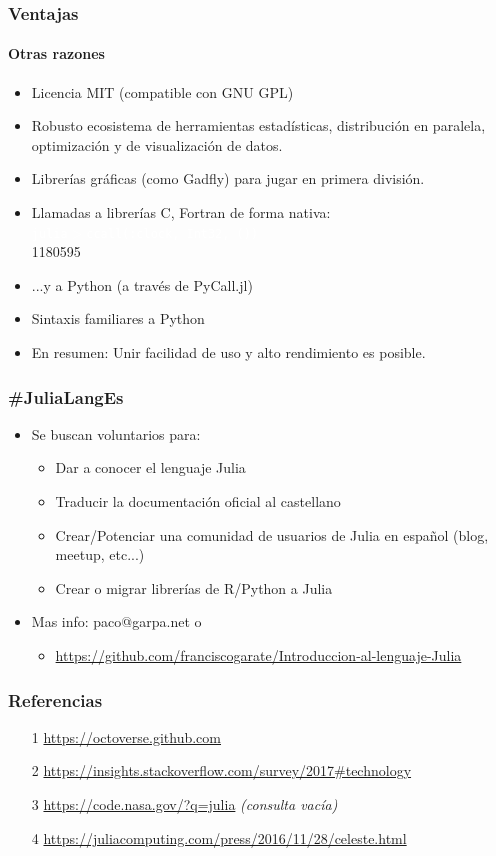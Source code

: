 \documentclass{beamer}
\providecommand{\comando}[1]{\texttt{\colorbox{morado_w}{\textcolor{white}{#1}}}}
\begin{document}
\begin{frame}
\frametitle{Ventajas}
\framesubtitle{Otras razones}
\begin{itemize}
	\item Licencia MIT (compatible con GNU GPL)
	\item Robusto ecosistema de herramientas estadísticas, distribución en paralela, optimización y de visualización de datos.
	\item Librerías gráficas (como Gadfly) para jugar en primera división.
	\item Llamadas a librerías C, Fortran de forma nativa:\\
	\comando{julia$>$ccall(:clock, Int32, ())}\\
	1180595\\
	\item ...y a Python (a través de PyCall.jl)
	\item Sintaxis familiares a Python
	\item En resumen: Unir facilidad de uso y alto rendimiento es posible.
\end{itemize}
\end{frame}


\begin{frame}
\frametitle{\#JuliaLangEs}
\begin{itemize}
	\item Se buscan voluntarios para:
	\begin{itemize}
		\item Dar a conocer el lenguaje Julia 
		\item Traducir la documentación oficial al castellano
		\item Crear/Potenciar una comunidad de usuarios de Julia en español (blog, meetup, etc...)
		\item Crear o migrar librerías de R/Python a Julia
	\end{itemize}
	\item Mas info: paco@garpa.net o
	\begin{itemize}
	\item \url{https://github.com/franciscogarate/Introduccion-al-lenguaje-Julia}
	\end{itemize}
\end{itemize}
\end{frame}

\begin{frame}
\frametitle{Referencias}
\begin{itemize}
	\item [1]{\url{https://octoverse.github.com}}
	\item [2]{\url{https://insights.stackoverflow.com/survey/2017\#technology}}
	\item [3]{\url{https://code.nasa.gov/?q=julia} \textit{(consulta vacía)}}
	\item [4]{\url{https://juliacomputing.com/press/2016/11/28/celeste.html}}
\end{itemize}
\end{frame}
\end{document}
